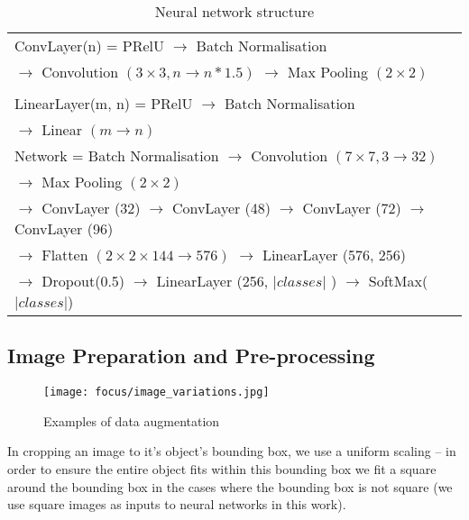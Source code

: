 \begin{table}[h]
  \centering
    \caption{Neural network structure }
\begin{tabular}{ l } 

\toprule

 ConvLayer(n) = PRelU $\rightarrow$ Batch Normalisation \\ 
 $\rightarrow$  Convolution $(3\times3, n \rightarrow n * 1.5)$ $\rightarrow$  Max Pooling $(2\times2)$ \\
\\
 LinearLayer(m, n)  = PRelU $\rightarrow$ Batch Normalisation \\  $\rightarrow$  Linear $(m \rightarrow n)$ \\
\toprule
  Network = Batch Normalisation $\rightarrow$
 Convolution $(7\times7, 3 \rightarrow 32)$ \\
 $\rightarrow$ Max Pooling $(2\times2)$   \\

  $\rightarrow$ ConvLayer (32) $\rightarrow$  ConvLayer (48) $\rightarrow$ ConvLayer (72) $\rightarrow$ ConvLayer (96)   \\
  
  
  $\rightarrow$ Flatten $(2\times2\times144 \rightarrow 576)$ $\rightarrow$ LinearLayer (576, 256) \\
  
  $\rightarrow$ Dropout(0.5) $\rightarrow$ LinearLayer (256, $\vert classes \vert$ )  $\rightarrow$  SoftMax($\vert classes \vert$) \\
  
    
       
\toprule
\end{tabular}

\label{fig:network}
\end{table}




\subsection {Image Preparation and Pre-processing}


\begin{figure*}[t]
    \caption{Examples of data augmentation }
\centering
\texttt{[image: focus/image\_variations.jpg]}
\label{fig:variations}
\end{figure*}


In cropping an image to it's object's bounding box, we use a uniform scaling -- in order to ensure the entire object fits within this bounding box we fit a square around the bounding box in the cases where the bounding box is not square (we use square images as inputs to neural networks in this work).

